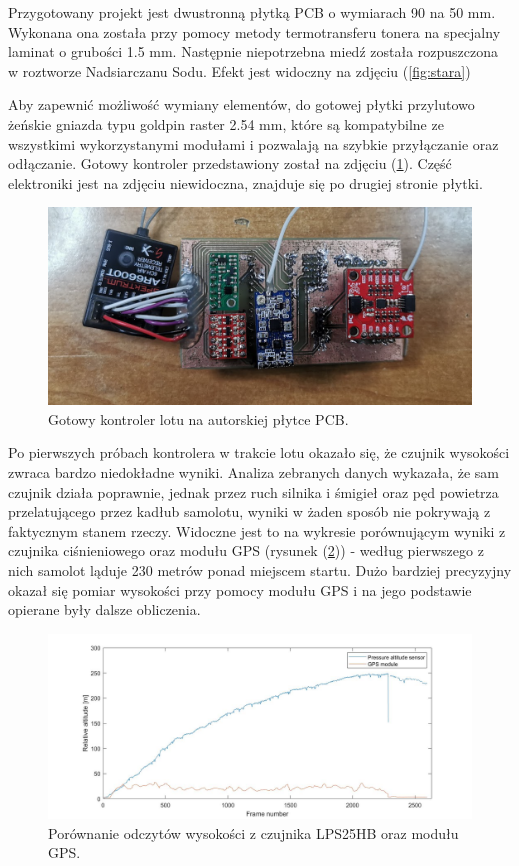 \documentclass[12pt, a4paper]{article}
\let\oldref\ref
\renewcommand{\ref}[1]{(\oldref{#1})}
\begin{document}
Przygotowany projekt jest dwustronną płytką PCB o wymiarach 90 na 50 mm. Wykonana ona została przy pomocy metody termotransferu tonera na specjalny laminat o grubości 1.5 mm. Następnie niepotrzebna miedź została rozpuszczona w roztworze Nadsiarczanu Sodu. Efekt jest widoczny na zdjęciu \ref{fig:stara}

Aby zapewnić możliwość wymiany elementów, do gotowej płytki przylutowo żeńskie gniazda typu goldpin raster 2.54 mm, które są kompatybilne ze wszystkimi wykorzystanymi modułami i pozwalają na szybkie przyłączanie oraz odłączanie. Gotowy kontroler przedstawiony został na zdjęciu \ref{fig:starycaly}. Część elektroniki jest na zdjęciu niewidoczna, znajduje się po drugiej stronie płytki.

\begin{figure}[ht]
    \centering
    \includegraphics[width=1\textwidth]{kontorolerstary}
    \caption{Gotowy kontroler lotu na autorskiej płytce PCB.}
    \label{fig:starycaly}
\end{figure}

Po pierwszych próbach kontrolera w trakcie lotu okazało się, że czujnik wysokości zwraca bardzo niedokładne wyniki. Analiza zebranych danych wykazała, że sam czujnik działa poprawnie, jednak przez ruch silnika i śmigieł oraz pęd powietrza przelatującego przez kadłub samolotu, wyniki w żaden sposób nie pokrywają z faktycznym stanem rzeczy. Widoczne jest to na wykresie porównującym wyniki z czujnika ciśnieniowego oraz modułu GPS (rysunek \ref{fig:alti}) - według pierwszego z nich samolot ląduje 230 metrów ponad miejscem startu. Dużo bardziej precyzyjny okazał się pomiar wysokości przy pomocy modułu GPS i na jego podstawie opierane były dalsze obliczenia.

\begin{figure}[ht]
    \centering
    \includegraphics[width=1\textwidth]{alti}
    \caption{Porównanie odczytów wysokości z czujnika LPS25HB oraz modułu GPS.}
    \label{fig:alti}
\end{figure}
\end{document}

